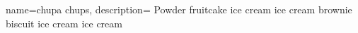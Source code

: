 


{
  name={chupa chups},
  description= {Powder fruitcake ice cream ice cream brownie biscuit ice cream ice cream}
}
